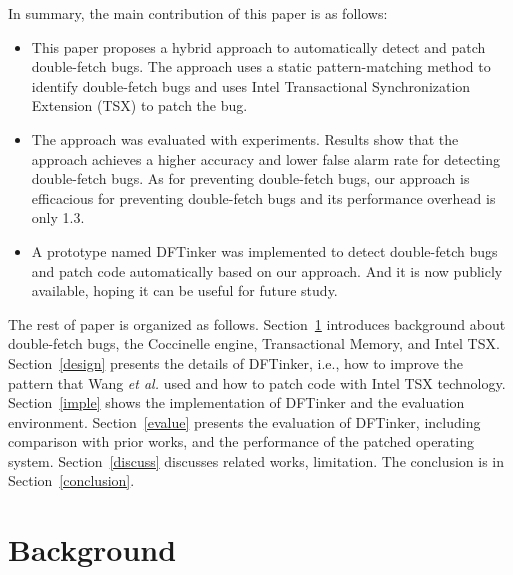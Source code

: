 \documentclass[10pt]{llncs}
\begin{document}

In summary, the main contribution of this paper is as follows:
\begin{itemize}
\item  This paper proposes a hybrid approach to automatically detect and patch double-fetch bugs. The approach uses a static pattern-matching method to identify double-fetch bugs and uses Intel Transactional Synchronization Extension (TSX) to patch the bug.
\item  The approach was evaluated with experiments. Results show that the approach achieves a higher accuracy and lower false alarm rate for detecting double-fetch bugs. As for preventing double-fetch bugs, our approach is efficacious for preventing double-fetch bugs and its performance overhead is only 1.3.
\item A prototype named DFTinker was implemented to detect double-fetch bugs and patch code automatically based on our approach. And it is now publicly available, hoping it can be useful for future study.
\end{itemize}
The rest of paper is organized as follows. Section~\ref{back} introduces background about double-fetch bugs, the Coccinelle engine, Transactional Memory, and Intel TSX. Section~\ref{design} presents the details of DFTinker, i.e., how to improve the pattern that Wang \textit{et al.} used and how to patch code with Intel TSX technology. Section~\ref{imple} shows the implementation of DFTinker and the evaluation environment. Section~\ref{evalue} presents the evaluation of DFTinker, including comparison with prior works, and the performance of the patched operating system. Section~\ref{discuss} discusses related works, limitation. The conclusion is in Section~\ref{conclusion}.

\section{Background}%
\label{back}
\end{document}
